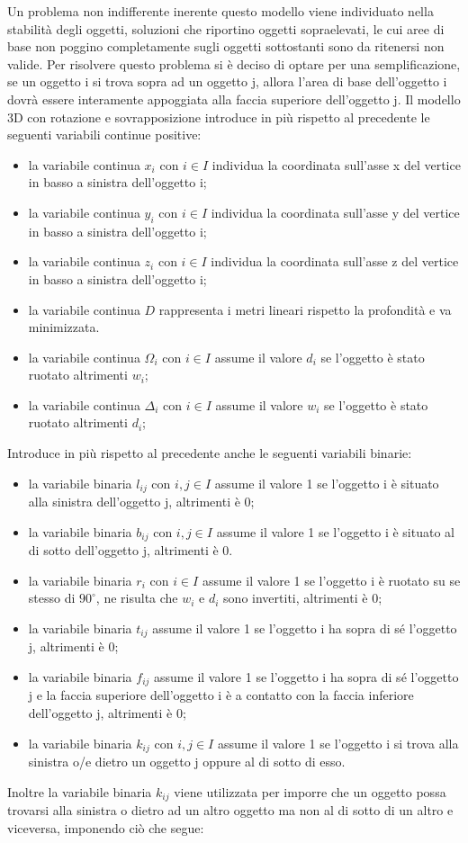 Un problema non indifferente inerente questo modello viene individuato nella stabilità degli oggetti, soluzioni che riportino oggetti sopraelevati, le cui aree di base non poggino completamente sugli oggetti sottostanti sono da ritenersi non valide. Per risolvere questo problema si è deciso di optare per una semplificazione, se un oggetto i si trova sopra ad un oggetto j, allora l'area di base dell'oggetto i dovrà essere interamente appoggiata alla faccia superiore dell'oggetto j.
\newpage
Il modello 3D con rotazione e sovrapposizione introduce in più rispetto al precedente le seguenti variabili continue positive:
\begin{itemize}
	\item la variabile continua $x_{i}$ con $i \in I$ individua la coordinata sull'asse x del vertice in basso a sinistra dell'oggetto i;
	\item la variabile continua $y_{i}$ con $i \in I$ individua la coordinata sull'asse y del vertice in basso a sinistra dell'oggetto i;
	\item la variabile continua $z_{i}$ con $i \in I$ individua la coordinata sull'asse z del vertice in basso a sinistra dell'oggetto i;
	\item la variabile continua $D$ rappresenta i metri lineari rispetto la profondità e va minimizzata.
	\item la variabile continua $\Omega_{i}$ con $i \in I$ assume il valore $d_i$ se l'oggetto è stato ruotato altrimenti $w_i$;
	\item la variabile continua $\Delta_{i}$ con $i \in I$ assume il valore $w_i$ se l'oggetto è stato ruotato altrimenti $d_i$;
\end{itemize}
Introduce in più rispetto al precedente anche le seguenti variabili binarie:
\begin{itemize}
	\item la variabile binaria $l_{ij}$ con $i,j \in I$ assume il valore 1 se l'oggetto i è situato alla sinistra dell'oggetto j, altrimenti è 0;
	\item la variabile binaria $b_{ij}$ con $i,j \in I$ assume il valore 1 se l'oggetto i è situato al di sotto dell'oggetto j, altrimenti è 0.
	\item la variabile binaria $r_{i}$ con $i \in I$ assume il valore 1 se l'oggetto i è ruotato su se stesso di $90^{\circ}$, ne risulta che $w_{i}$ e $d_{i}$ sono invertiti, altrimenti è 0;
	\item la variabile binaria $t_{ij}$ assume il valore 1 se l'oggetto i ha sopra di sé l'oggetto j, altrimenti è 0;
	\item la variabile binaria $f_{ij}$ assume il valore 1 se l'oggetto i ha sopra di sé l'oggetto j e la faccia superiore dell'oggetto i è a contatto con la faccia inferiore dell'oggetto j, altrimenti è 0;
	\item la variabile binaria $k_{ij}$ con $i,j \in I$ assume il valore 1 se l'oggetto i si trova alla sinistra o/e dietro un oggetto j oppure al di sotto di esso. 
\end{itemize}
\newpage
Inoltre la variabile binaria $k_{ij}$ viene utilizzata per imporre che un oggetto possa trovarsi alla sinistra o dietro ad un altro oggetto ma non al di sotto di un altro e viceversa, imponendo ciò che segue:


